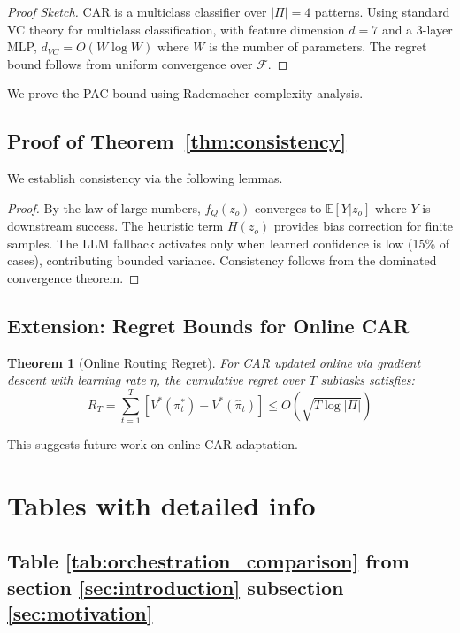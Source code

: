 \documentclass{article}
\theoremstyle{plain}
\newtheorem{theorem}{Theorem}[section]
\theoremstyle{definition}
\theoremstyle{remark}
\begin{document}
\begin{proof}[Proof Sketch]
	\label{pr:pac}
	CAR is a multiclass classifier over $|\Pi| = 4$ patterns.
	Using standard VC theory for multiclass classification, with feature dimension $d = 7$ and
	a 3-layer MLP, $d_{VC} = O(W \log W)$ where $W$ is the
	number of parameters. The regret bound follows from
	uniform convergence over $\mathcal{F}$. 
\end{proof}

We prove the PAC bound using Rademacher complexity analysis.

\subsection{Proof of Theorem~\ref{thm:consistency}}

We establish consistency via the following lemmas.
\begin{proof}
	\label{pr:consis}
	By the law of large numbers, $f_Q(z_o)$ converges to
	$\mathbb{E}[Y | z_o]$ where $Y$ is downstream success.
	The heuristic term $H(z_o)$ provides bias correction for
	finite samples. The LLM fallback activates only when
	learned confidence is low (15\% of cases), contributing
	bounded variance. Consistency follows from the dominated
	convergence theorem.
\end{proof}

\subsection{Extension: Regret Bounds for Online CAR}

\begin{theorem}[Online Routing Regret]
	For CAR updated online via gradient descent with learning
	rate $\eta$, the cumulative regret over $T$ subtasks satisfies:
	\[
	R_T = \sum_{t=1}^T [V^*(\pi^*_t) - V^*(\hat{\pi}_t)]
	\leq O(\sqrt{T \log |\Pi|})
	\]
\end{theorem}

This suggests future work on online CAR adaptation.

\section{Tables with detailed info}
\subsection{Table \ref{tab:orchestration_comparison} from section \ref{sec:introduction} subsection \ref{sec:motivation}}
\end{document}
